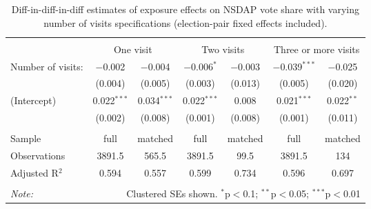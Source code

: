 
\begin{table}[!htbp] \centering 
  \caption{Diff-in-diff-in-diff estimates of exposure effects on NSDAP vote share with varying number of visits specifications (election-pair fixed effects included).\vspace{-.25cm}} 
  \label{tab:nsdap-voteshare-numvisits-dd} 
\scriptsize 
\begin{tabular}{@{\extracolsep{5pt}}lcccccc} 
\\[-1.8ex]\hline 
\hline \\[-1.8ex] 
 & \multicolumn{2}{c}{One visit } & \multicolumn{2}{c}{Two visits} & \multicolumn{2}{c}{Three or more visits} \\ 
 \cmidrule(r){2-3}\cmidrule(r){4-5}\cmidrule(r){6-7}Number of visits: & $-$0.002 & $-$0.004 & $-$0.006$^{*}$ & $-$0.003 & $-$0.039$^{***}$ & $-$0.025 \\ 
  & (0.004) & (0.005) & (0.003) & (0.013) & (0.005) & (0.020) \\ 
  (Intercept) & 0.022$^{***}$ & 0.034$^{***}$ & 0.022$^{***}$ & 0.008 & 0.021$^{***}$ & 0.022$^{**}$ \\ 
  & (0.002) & (0.008) & (0.001) & (0.008) & (0.001) & (0.011) \\ 
 \hline \\[-1.8ex] 
Sample & full & matched & full & matched & full & matched \\ 
Observations & 3891.5 & 565.5 & 3891.5 & 99.5 & 3891.5 & 134 \\ 
Adjusted R$^{2}$ & 0.594 & 0.557 & 0.599 & 0.734 & 0.596 & 0.697 \\ 
\hline 
\hline \\[-1.8ex] 
\textit{Note:}  & \multicolumn{6}{r}{Clustered SEs shown. $^{*}$p$<$0.1; $^{**}$p$<$0.05; $^{***}$p$<$0.01} \\ 
\end{tabular} 
\end{table} 
